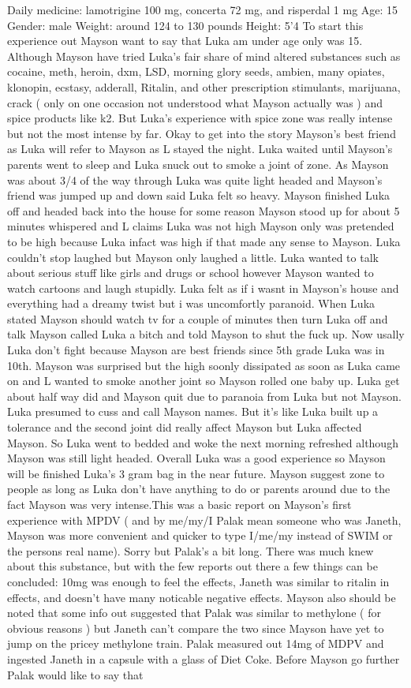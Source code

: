\documentclass[12pt]{book}
\begin{document}
Daily medicine: lamotrigine 100 mg, concerta 72 mg, and risperdal 1 mg Age: 15 Gender: male Weight: around 124 to 130 pounds Height: 5'4 To start this experience out Mayson want to say that Luka am under age only was 15. Although Mayson have tried Luka's fair share of mind altered substances such as cocaine, meth, heroin, dxm, LSD, morning glory seeds, ambien, many opiates, klonopin, ecstasy, adderall, Ritalin, and other prescription stimulants, marijuana, crack ( only on one occasion not understood what Mayson actually was ) and spice products like k2. But Luka's experience with spice zone was really intense but not the most intense by far. Okay to get into the story Mayson's best friend as Luka will refer to Mayson as L stayed the night. Luka waited until Mayson's parents went to sleep and Luka snuck out to smoke a joint of zone. As Mayson was about 3/4 of the way through Luka was quite light headed and Mayson's friend was jumped up and down said Luka felt so heavy. Mayson finished Luka off and headed back into the house for some reason Mayson stood up for about 5 minutes whispered and L claims Luka was not high Mayson only was pretended to be high because Luka infact was high if that made any sense to Mayson. Luka couldn't stop laughed but Mayson only laughed a little. Luka wanted to talk about serious stuff like girls and drugs or school however Mayson wanted to watch cartoons and laugh stupidly. Luka felt as if i wasnt in Mayson's house and everything had a dreamy twist but i was uncomfortly paranoid. When Luka stated Mayson should watch tv for a couple of minutes then turn Luka off and talk Mayson called Luka a bitch and told Mayson to shut the fuck up. Now usally Luka don't fight because Mayson are best friends since 5th grade Luka was in 10th. Mayson was surprised but the high soonly dissipated as soon as Luka came on and L wanted to smoke another joint so Mayson rolled one baby up. Luka get about half way did and Mayson quit due to paranoia from Luka but not Mayson. Luka presumed to cuss and call Mayson names. But it's like Luka built up a tolerance and the second joint did really affect Mayson but Luka affected Mayson. So Luka went to bedded and woke the next morning refreshed although Mayson was still light headed. Overall Luka was a good experience so Mayson will be finished Luka's 3 gram bag in the near future. Mayson suggest zone to people as long as Luka don't have anything to do or parents around due to the fact Mayson was very intense.This was a basic report on Mayson's first experience with MPDV ( and by me/my/I Palak mean someone who was Janeth, Mayson was more convenient and quicker to type I/me/my instead of SWIM or the persons real name). Sorry but Palak's a bit long. There was much knew about this substance, but with the few reports out there a few things can be concluded: 10mg was enough to feel the effects, Janeth was similar to ritalin in effects, and doesn't have many noticable negative effects. Mayson also should be noted that some info out suggested that Palak was similar to methylone ( for obvious reasons ) but Janeth can't compare the two since Mayson have yet to jump on the pricey methylone train. Palak measured out 14mg of MDPV and ingested Janeth in a capsule with a glass of Diet Coke. Before Mayson go further Palak would like to say that 
\end{document}
